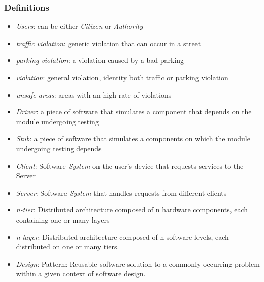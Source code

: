 \documentclass{article}
\begin{document}
\subsubsection{Definitions}
\begin{itemize}
    \item \textit{Users}: can be either \textit{Citizen} or \textit{Authority}
    \item \textit{traffic violation}: generic violation that can occur in a street
    \item \textit{parking violation}: a violation caused by a bad parking
    \item \textit{violation}: general violation, identity both traffic or parking violation
    \item \textit{unsafe areas}: areas with an high rate of violations
    \item \textit{Driver}: a piece of software that simulates a component that depends on the module undergoing testing
    \item \textit{Stub}: a piece of software that simulates a components on which the module undergoing testing depends
    \item \textit{Client}: Software \textit{System} on the user's device that requests services to the Server
    \item \textit{Server}: Software \textit{System} that handles requests from different clients
    \item \textit{n-tier}: Distributed architecture composed of n hardware components, each containing one or many layers
    \item \textit{n-layer}: Distributed architecture composed of n software levels, each distributed on one or many tiers.
    \item \textit{Design}: Pattern: Reusable software solution to a commonly occurring problem within a given context of software design.
\end{itemize}
\end{document}
